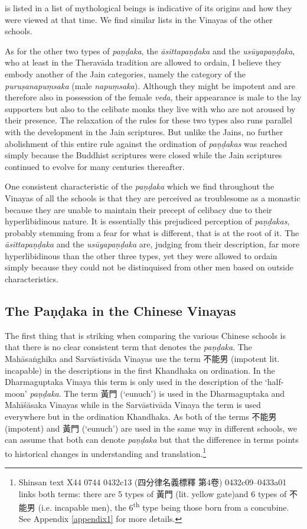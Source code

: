 is listed in a list of mythological beings is indicative of its origins and how they were viewed at that time. We find similar lists in the Vinayas of the other schools.

As for the other two types of {\em paṇḍaka}, the {\em āsittapaṇḍaka} and the {\em usūyapaṇḍaka}, who at least in the Theravāda tradition are allowed to ordain, I believe they embody another of the Jain categories, namely the category of the {\em puruṣanapuṃsaka} (male {\em napuṃsaka}). Although they might be impotent and are therefore also in possession of the female {\em veda}, their appearance is male to the lay supporters but also to the celibate monks they live with who are not aroused by their presence. The relaxation of the rules for these two types also runs parallel with the development in the Jain scriptures. But unlike the Jains, no further abolishment of this entire rule against the ordination of {\em paṇḍakas} was reached simply because the Buddhist scriptures were closed while the Jain scriptures continued to evolve for many centuries thereafter.

One consistent characteristic of the {\em paṇḍaka} which we find throughout the Vinayas of all the schools is that they are perceived as troublesome as a monastic because they are unable to maintain their precept of celibacy due to their hyperlibidinous nature. It is essentially this prejudiced perception of {\em paṇḍakas}, probably stemming from a fear for what is different, that is at the root of it. The {\em āsittapaṇḍaka} and the {\em usūyapaṇḍaka} are, judging from their description, far more hyperlibidinous than the other three types, yet they were allowed to ordain simply because they could not be distinquised from other men based on outside characteristics. 

\subsection{The Paṇḍaka in the Chinese Vinayas}
The first thing that is striking when comparing the various Chinese schools is that there is no clear consistent term that denotes the {\em paṇḍaka}. The Mahāsaṅghika and Sarvāstivāda Vinayas use the term 不能男 (impotent lit. incapable) in the descriptions in the first Khandhaka on ordination. In the Dharmaguptaka Vinaya this term is only used in the description of the `half-moon' {\em paṇḍaka}. The term 黃門 (`eunuch') is used in the Dharmaguptaka and Mahīśāsaka Vinayas while in the Sarvāstivāda Vinaya the term is used everywhere but in the ordination Khandhaka. As both of the terms 不能男 (impotent) and 黃門 (`eunuch') are used in the same way in different schools, we can assume that both can denote {\em paṇḍaka} but that the difference in terms points to historical changes in understanding and translation.\footnote{Shinsan text X44 0744 0432c13 (四分律名義標釋 第4卷) 0432c09–0433a01 links both terms: there are 5 types of 黃門 (lit. yellow gate)and 6 types of 不能男 (i.e. incapable men), the 6\textsuperscript{th} type being those born from a concubine. See Appendix \ref{appendix1} for more details.}

